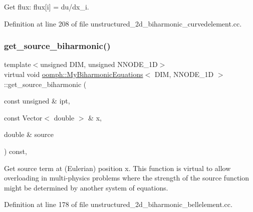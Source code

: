 Get flux\+: flux\mbox{[}i\mbox{]} = du/dx\+\_\+i. 



Definition at line 208 of file unstructured\+\_\+2d\+\_\+biharmonic\+\_\+curvedelement.\+cc.

\mbox{\label{classoomph_1_1MyBiharmonicEquations_ad8decaf798d0f279affc5ffebbb4ace2}} 
\subsubsection{\texorpdfstring{get\+\_\+source\+\_\+biharmonic()}{get\_source\_biharmonic()}}
{\footnotesize\ttfamily template$<$unsigned D\+IM, unsigned N\+N\+O\+D\+E\+\_\+1D$>$ \\
virtual void \hyperlink{classoomph_1_1MyBiharmonicEquations}{oomph\+::\+My\+Biharmonic\+Equations}$<$ D\+IM, N\+N\+O\+D\+E\+\_\+1D $>$\+::get\+\_\+source\+\_\+biharmonic (\begin{DoxyParamCaption}\item[{const unsigned \&}]{ipt,  }\item[{const Vector$<$ double $>$ \&}]{x,  }\item[{double \&}]{source }\end{DoxyParamCaption}) const\hspace{0.3cm}{\ttfamily [inline]}, {\ttfamily [virtual]}}

Get source term at (Eulerian) position x. This function is virtual to allow overloading in multi-\/physics problems where the strength of the source function might be determined by another system of equations. 

Definition at line 178 of file unstructured\+\_\+2d\+\_\+biharmonic\+\_\+bellelement.\+cc.

\mbox{\label{classoomph_1_1MyBiharmonicEquations_a30d824f604ff00b823238d5b18561693}} 
